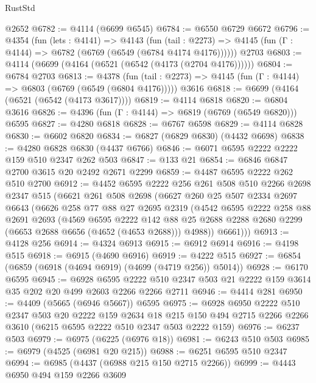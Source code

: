 \begin{lexlean}{RustStd}
\begin{coremodule}
{\begin{coremodule}
{{{{{{{{{{{{{{    @2652
@6782 := @4114 (@6699 @6545)
@6784 := @6550 @6729 @6672
@6796 := @4354
    (fun (lets : @4141) =>
    @4143
      (fun (tail : @2273) => @4145 (fun (Γ : @4144) => @6782 (@6769 (@6549 (@6784 @4174 @4176))))))
    @2703
@6803 := @4114 (@6699 (@4164 (@6521 (@6542 (@4173 (@2704 @4176))))))
@6804 := @6784 @2703
@6813 := @4378
    (fun (tail : @2273) => @4145 (fun (Γ : @4144) => @6803 (@6769 (@6549 (@6804 @4176)))))
    @3616
@6818 := @6699 (@4164 (@6521 (@6542 (@4173 @3617))))
@6819 := @4114 @6818
@6820 := @6804 @3616
@6826 := @4396 (fun (Γ : @4144) => @6819 (@6769 (@6549 @6820))) @6595
@6827 := @4280 @6818
@6828 := @6767 @6598
@6829 := @4114 @6828
@6830 := @6602 @6820
@6834 := @6827 (@6829 @6830) (@4432 @6698)
@6838 := @4280 @6828 @6830 (@4437 @6766)
@6846 := @6071 @6595 @2222 @2222 @159 @510 @2347 @262 @503
@6847 := @133 @21
@6854 := @6846 @6847 @2700 @3615 @20 @2492 @2671 @2299
@6859 := @4487 @6595 @2222 @262 @510 @2700
@6912 := @4452
    @6595
    @2222
    @256
    @261
    @508
    @510
    @2266
    @2698
    @2347
    @515
    (@6621
      @261
      @508
      @2698
      (@6627
        @260
        @25
        @507
        @2334
        @2697
        @6643
        (@6626
          @258
          @77
          @88
          @27
          @2695
          @2319
          (@4542
            @6595
            @2222
            @258
            @88
            @2691
            @2693
            (@4569
              @6595
              @2222
              @142
              @88
              @25
              @2688
              @2288
              @2680
              @2299
              (@6653 @2688 @6656 (@4652 (@4653 @2688)))
              @4988))
          @6661)))
@6913 := @4128 @256
@6914 := @4324 @6913
@6915 := @6912 @6914
@6916 := @4198 @515
@6918 := @6915 (@4690 @6916)
@6919 := @4222 @515
@6927 := @6854 (@6859 (@6918 (@4694 @6919) (@4699 (@4719 @256)) @5014))
@6928 := @6170 @6595
@6945 := @6928
    @6595
    @2222
    @510
    @2347
    @503
    @21
    @2222
    @159
    @3614
    @35
    @202
    @20
    @499
    @2603
    @2266
    @2266
    @2711
@6946 := @4414 @281
@6950 := @4409 (@5665 (@6946 @5667)) @6595
@6975 := @6928
    @6950
    @2222
    @510
    @2347
    @503
    @20
    @2222
    @159
    @2634
    @18
    @215
    @150
    @494
    @2715
    @2266
    @2266
    @3610
    (@6215 @6595 @2222 @510 @2347 @503 @2222 @159)
@6976 := @6237 @503
@6979 := @6975 (@6225 (@6976 @18))
@6981 := @6243 @510 @503
@6985 := @6979 (@4525 (@6981 @20 @215))
@6988 := @6251 @6595 @510 @2347
@6994 := @6985 (@4437 (@6988 @215 @150 @2715 @2266))
@6999 := @4443 @6950 @494 @159 @2266 @3609
}}}}}}}}}}}}}}
\end{coremodule}}
\end{coremodule}
\end{lexlean}
